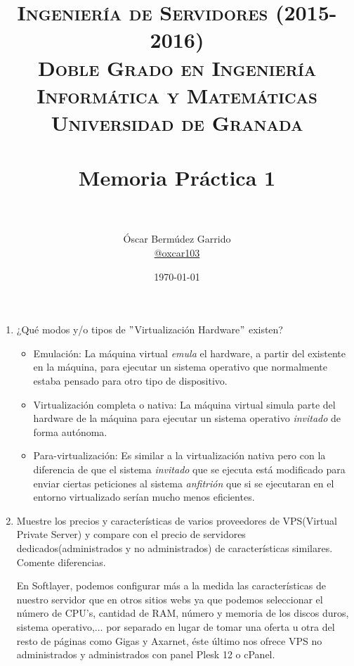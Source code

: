 \documentclass[paper=a4, fontsize=11pt]{scrartcl} %
\title{	
\normalfont \normalsize 
\textsc{{\bf Ingeniería de Servidores (2015-2016)} \\ Doble Grado en Ingeniería Informática y Matemáticas \\ Universidad de Granada} \\ [25pt] %
\horrule{0.5pt} \\[0.4cm] %
\huge Memoria Práctica 1 \\ %
\horrule{2pt} \\[0.5cm] %
}
\author{Óscar Bermúdez Garrido\\ \href{http://www.github.com/oxcar103}{@oxcar103}} %
\date{\normalsize\today} %
\numberwithin{equation}{section} %
\numberwithin{figure}{section} %
\numberwithin{table}{section} %
\begin{document}
\maketitle %
\newpage %
\tableofcontents %
\listoffigures

\begin{enumerate}
	\section{Introducción}
	\subsection{Concepto de Máquina Virtual y virtualización}
		\item ¿Qué modos y/o tipos de $"$Virtualización Hardware$"$ existen?
		\begin{itemize}
			\item Emulación: La máquina virtual \textit{emula} el hardware, a partir del existente
			en la máquina, para ejecutar un sistema operativo que normalmente estaba pensado para
			otro tipo de dispositivo.
			
			\item Virtualización completa o nativa: La máquina virtual simula parte del hardware de
			la máquina para ejecutar un sistema operativo \textit{invitado} de forma autónoma.
			
			\item Para-virtualización: Es similar a la virtualización nativa pero con la diferencia
			de que el sistema \textit{invitado} que se ejecuta está modificado para enviar ciertas
			peticiones al sistema \textit{anfitrión} que si se ejecutaran en el entorno virtualizado
			serían mucho menos eficientes.
		\end{itemize}
		\cite{Virt}
		
		\item Muestre los precios y características de varios proveedores de VPS(Virtual Private
		Server) y compare con el precio de servidores dedicados(administrados y no administrados)
		de características similares. Comente diferencias.
		
		En Softlayer\cite{VPS_IBM}, podemos configurar más a la medida las características de
		nuestro servidor que en otros sitios webs ya que podemos seleccionar el número de CPU's,
		cantidad de RAM, número y memoria de los discos duros, sistema operativo,... por separado
		en lugar de tomar una oferta u otra del resto de páginas como Gigas\cite{VPS_Gigas} y
		Axarnet, éste último nos ofrece VPS no administrados\cite{VPS_Axarnet} y administrados con
		panel Plesk 12\cite{VPS_Axarnet_admin} o cPanel\cite{VPS_Axarnet_admin_2}.
		

\end{enumerate}
\end{document}
